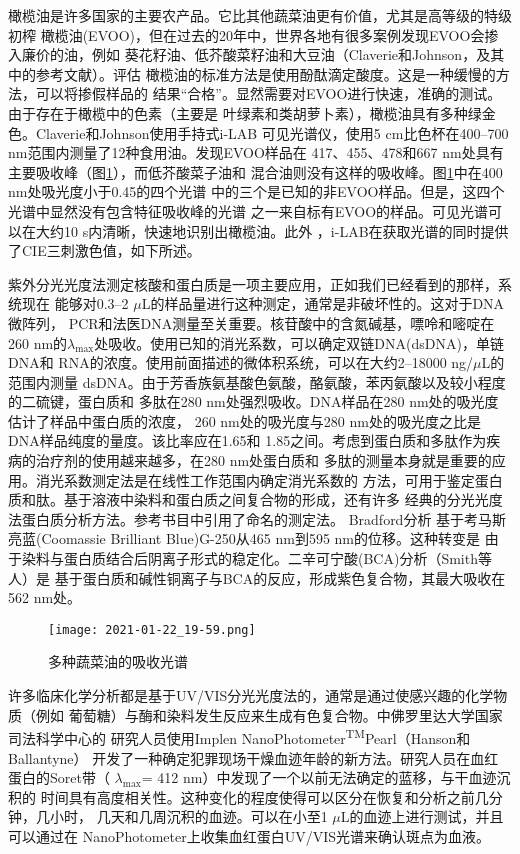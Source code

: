 橄榄油是许多国家的主要农产品。它比其他蔬菜油更有价值，尤其是高等级的特级初榨
橄榄油(EVOO)，但在过去的20年中，世界各地有很多案例发现EVOO会掺入廉价的油，例如
葵花籽油、低芥酸菜籽油和大豆油（Claverie和Johnson，及其中的参考文献）。评估
橄榄油的标准方法是使用酚酞滴定酸度。这是一种缓慢的方法，可以将掺假样品的
结果“合格”。显然需要对EVOO进行快速，准确的测试。由于存在于橄榄中的色素（主要是
叶绿素和类胡萝卜素），橄榄油具有多种绿金色。Claverie和Johnson使用手持式i-LAB
可见光谱仪，使用5 cm比色杯在400--700 nm范围内测量了12种食用油。发现EVOO样品在
417、455、478和667 nm处具有主要吸收峰（图\ref{fig:5.42}），而低芥酸菜子油和
混合油则没有这样的吸收峰。图\ref{fig:5.42}中在400 nm处吸光度小于0.45的四个光谱
中的三个是已知的非EVOO样品。但是，这四个光谱中显然没有包含特征吸收峰的光谱
之一来自标有EVOO的样品。可见光谱可以在大约10 s内清晰，快速地识别出橄榄油。此外
，i-LAB在获取光谱的同时提供了CIE三刺激色值，如下所述。

紫外分光光度法测定核酸和蛋白质是一项主要应用，正如我们已经看到的那样，系统现在
能够对0.3--2 $\mu$L的样品量进行这种测定，通常是非破坏性的。这对于DNA微阵列，
PCR和法医DNA测量至关重要。核苷酸中的含氮碱基，嘌呤和嘧啶在260 nm的$\lambda_
{\text{max}}$处吸收。使用已知的消光系数，可以确定双链DNA(dsDNA)，单链DNA和
RNA的浓度。使用前面描述的微体积系统，可以在大约2--18000 ng/$\mu$L的范围内测量
dsDNA。由于芳香族氨基酸色氨酸，酪氨酸，苯丙氨酸以及较小程度的二硫键，蛋白质和
多肽在280 nm处强烈吸收。DNA样品在280 nm处的吸光度估计了样品中蛋白质的浓度，
260 nm处的吸光度与280 nm处的吸光度之比是DNA样品纯度的量度。该比率应在1.65和
1.85之间。考虑到蛋白质和多肽作为疾病的治疗剂的使用越来越多，在280 nm处蛋白质和
多肽的测量本身就是重要的应用。消光系数测定法是在线性工作范围内确定消光系数的
方法，可用于鉴定蛋白质和肽。基于溶液中染料和蛋白质之间复合物的形成，还有许多
经典的分光光度法蛋白质分析方法。参考书目中引用了命名的测定法。 Bradford分析
基于考马斯亮蓝(Coomassie Brilliant Blue)G-250从465 nm到595 nm的位移。这种转变是
由于染料与蛋白质结合后阴离子形式的稳定化。二辛可宁酸(BCA)分析（Smith等人）是
基于蛋白质和碱性铜离子与BCA的反应，形成紫色复合物，其最大吸收在562 nm处。
\begin{figure}[htpb]
    \centering
    \texttt{[image: 2021-01-22\_19-59.png]}
    \caption{多种蔬菜油的吸收光谱}
    \label{fig:5.42}
\end{figure}

许多临床化学分析都是基于UV/VIS分光光度法的，通常是通过使感兴趣的化学物质（例如
葡萄糖）与酶和染料发生反应来生成有色复合物。中佛罗里达大学国家司法科学中心的
研究人员使用Implen NanoPhotometer\textsuperscript{TM}Pearl（Hanson和Ballantyne）
开发了一种确定犯罪现场干燥血迹年龄的新方法。研究人员在血红蛋白的Soret带（
$\lambda_{\text{max}}$= 412 nm）中发现了一个以前无法确定的蓝移，与干血迹沉积的
时间具有高度相关性。这种变化的程度使得可以区分在恢复和分析之前几分钟，几小时，
几天和几周沉积的血迹。可以在小至1 $\mu$L的血迹上进行测试，并且可以通过在
NanoPhotometer上收集血红蛋白UV/VIS光谱来确认斑点为血液。

